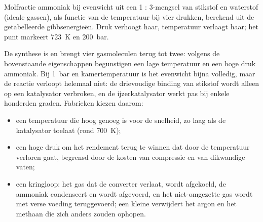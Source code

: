 \begin{omfigure}

{\small Molfractie ammoniak bij evenwicht uit een 1 : 3-mengsel van stikstof
en waterstof (ideale gassen), als functie van de temperatuur bij vier drukken,
berekend uit de getabelleerde gibbsenergieën. Druk verhoogt haar, temperatuur
verlaagt haar; het punt markeert \qty{723}{K} en \qty{200}{bar}.}
\end{omfigure}

De synthese is  en brengt vier gasmoleculen terug tot twee: volgens
de bovenstaande eigenschappen begunstigen een lage temperatuur en een hoge druk ammoniak.
Bij \qty{1}{bar} en kamertemperatuur is het evenwicht bijna volledig, maar
de reactie verloopt helemaal niet: de drievoudige binding van stikstof wordt alleen
op een katalysator verbroken, en de ijzerkatalysator werkt pas bij enkele honderden
graden. Fabrieken kiezen daarom:
\begin{itemize}
  \item een temperatuur die hoog genoeg is voor de snelheid, zo laag als de katalysator toelaat
        (rond \qty{700}{K});
  \item een hoge druk om het rendement terug te winnen dat door de temperatuur verloren gaat, begrensd
        door de kosten van compressie en van dikwandige vaten;
  \item een kringloop: het gas dat de converter verlaat, wordt afgekoeld, de ammoniak condenseert
        en wordt afgevoerd, en het niet-omgezette gas wordt met verse voeding teruggevoerd;
        een kleine  verwijdert het argon en het methaan die zich anders
        zouden ophopen.
\end{itemize}

